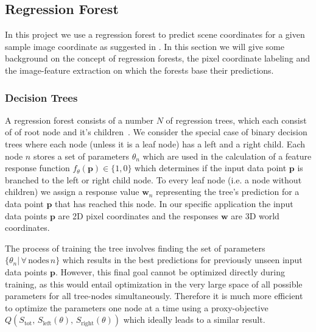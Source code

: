 \documentclass[final]{cvpr}
\begin{document}
\subsection{Regression Forest}

In this project we use a regression forest to predict scene coordinates for a given
sample image coordinate as suggested in \cite{shotton2013}. In this section we will
give some background on the concept of regression forests, the pixel coordinate
labeling and the image-feature extraction on which the forests base their predictions.\\

\subsubsection{Decision Trees}
A regression forest consists of a number $N$ of regression trees, which each consist of
of root node and it's children~\cite{Criminisi2013}. We consider the special case of binary decision trees
where each node (unless it is a leaf node) has a left and a right child. Each node $n$
stores a set of parameters $\theta_n$ which are used in the calculation of a
feature response function $f_{\theta}(\boldsymbol{p}) \in \{1, 0\}$ which determines if the input
data point $\boldsymbol{p}$ is branched to the left or right child node. To every leaf node
(i.e. a node without children) we assign a response value $\boldsymbol{w}_n$ representing
the tree's prediction for a data point $\boldsymbol{p}$ that has reached this node. In our
specific application the input data points $\boldsymbol{p}$ are 2D pixel coordinates and the
responses $\boldsymbol{w}$ are 3D world coordinates.

The process of training the tree involves finding the set of parameters
$\{\theta_n | \, \forall \, \text{nodes} \, n\}$ which results in the best predictions
for previously unseen input data points $\boldsymbol{p}$. However, this final goal cannot
be optimized directly during training, as this would entail optimization in the
very large space of all possible parameters for all tree-nodes simultaneously. Therefore
it is much more efficient to optimize the parameters one node at a time using a
proxy-objective $Q(S_{\text{tot}},\, S_{\text{left}}(\theta),\, S_{\text{right}}(\theta))$
which ideally leads to a similar result.
\end{document}
